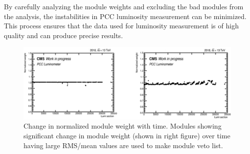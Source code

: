 
By carefully analyzing the module weights and excluding the bad modules from the analysis, the instabilities in PCC luminosity measurement can be minimized. This process ensures that the data used for luminosity measurement is of high quality and can produce precise results.




\begin{figure}[!htp]
\centering
\includegraphics[width=1\textwidth]{ashish_thesis/good_bad_modules_1.png}
\caption[Good/Bad module weights]{%
   Change in normalized module weight with time. Modules showing significant change in module weight (shown in right figure) over time having large RMS/mean values are used to make module veto list.
}
\label{fig:goodbadmodules}
\end{figure}

